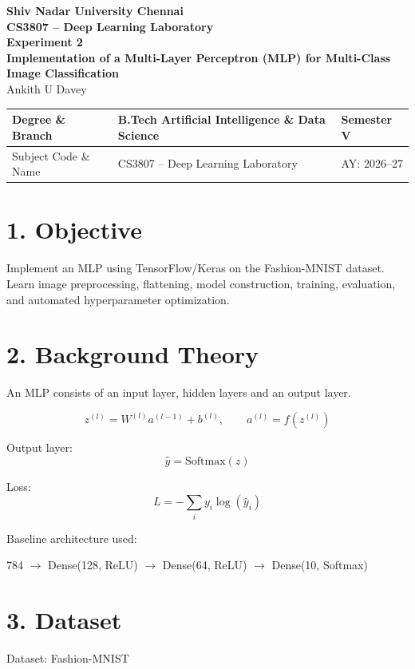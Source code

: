 \documentclass[11pt]{article}
\begin{document}
\begin{center}
{\Large\textbf{Shiv Nadar University Chennai}}\\
\textbf{CS3807 -- Deep Learning Laboratory}\\
\textbf{Experiment 2}\\
{\large\textbf{Implementation of a Multi-Layer Perceptron (MLP) for Multi-Class Image Classification}}\\[2mm]
Ankith U Davey 
\end{center}

\renewcommand{\arraystretch}{1.25}

\begin{tabular}{|p{3.8cm}|p{8cm}|p{2cm}|}
\hline
Degree \& Branch & B.Tech Artificial Intelligence \& Data Science & Semester V\\ \hline
Subject Code \& Name & CS3807 -- Deep Learning Laboratory & AY: 2026--27\\ \hline
\end{tabular}

\section*{1. Objective}
Implement an MLP using TensorFlow/Keras on the Fashion-MNIST dataset. Learn image preprocessing, flattening, model construction, training, evaluation, and automated hyperparameter optimization.

\section*{2. Background Theory}
An MLP consists of an input layer, hidden layers and an output layer.

\[
z^{(l)}=W^{(l)}a^{(l-1)}+b^{(l)},\qquad
a^{(l)}=f(z^{(l)})
\]

Output layer:
\[
\hat y=\mathrm{Softmax}(z)
\]

Loss:
\[
L=-\sum_i y_i\log(\hat y_i)
\]

Baseline architecture used:

\begin{center}
784 $\rightarrow$ Dense(128, ReLU) $\rightarrow$ Dense(64, ReLU) $\rightarrow$ Dense(10, Softmax)
\end{center}

\section*{3. Dataset}
Dataset: Fashion-MNIST
\end{document}

